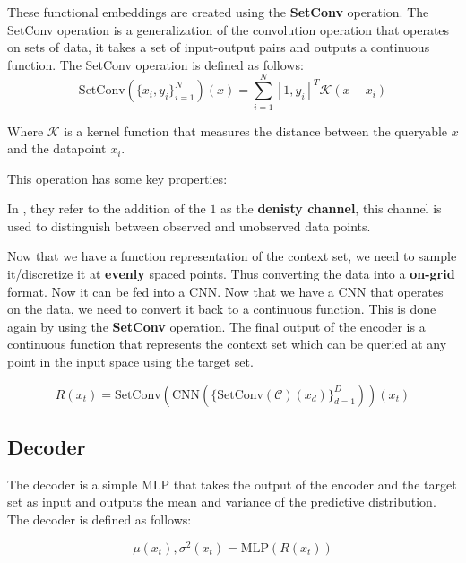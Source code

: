 \documentclass[main.tex]{subfiles}
\begin{document}
These functional embeddings are created using the \textbf{SetConv} operation. The SetConv operation is a generalization of the convolution operation that operates on sets of data, it takes a set of input-output pairs and outputs a continuous function. The SetConv operation is defined as follows:
\begin{equation}
	\text{SetConv}(\{x_i, y_i\}_{i=1}^{N})(x) = \sum_{i=1}^{N} [1, y_i] ^ T \mathcal{K}(x - x_i)
\end{equation}

Where $\mathcal{K}$ is a kernel function that measures the distance between the queryable $x$ and the datapoint $x_i$.

This operation has some key properties:

In \cite{gordon2020convolutional}, they refer to the addition of the $1$ as the \textbf{denisty channel}, this channel is used to distinguish between observed and unobserved data points. 

Now that we have a function representation of the context set, we need to sample it/discretize it at \textbf{evenly} spaced points. Thus converting the data into a \textbf{on-grid} format. Now it can be fed into a CNN. Now that we have a CNN that operates on the data, we need to convert it back to a continuous function. This is done again by using the \textbf{SetConv} operation. The final output of the encoder is a continuous function that represents the context set which can be queried at any point in the input space using the target set.

\begin{equation}
	R(x_t) = \text{SetConv}(\text{CNN}(\{\text{SetConv}(\mathcal{C})(x_d)\}_{d=1}^{D}))(x_t)
\end{equation}

\subsection{Decoder}

The decoder is a simple MLP that takes the output of the encoder and the target set as input and outputs the mean and variance of the predictive distribution. The decoder is defined as follows:

\begin{equation}
	\mu(x_t), \sigma^2(x_t) = \text{MLP}(R(x_t))
\end{equation}


\ifSubfilesClassLoaded{%
    \printbibliography{}
}{} 
\end{document}
